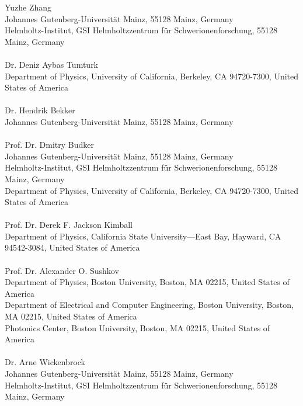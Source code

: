 \documentclass{WileyMSP-template}
\begin{document}
	
	\begin{affiliations}
		Yuzhe Zhang\\
		Johannes Gutenberg-Universit{\"a}t Mainz, 55128 Mainz, Germany\\
		Helmholtz-Institut, GSI Helmholtzzentrum f{\"u}r Schwerionenforschung, 55128 Mainz, Germany\\
		\,\\
		Dr. Deniz Aybas Tumturk\\
		Department of Physics, University of California, Berkeley, CA 94720-7300, United States of America\\
		\,\\
		Dr. Hendrik Bekker\\
		Johannes Gutenberg-Universit{\"a}t Mainz, 55128 Mainz, Germany\\
		\,\\
		Prof. Dr. Dmitry Budker\\
		Johannes Gutenberg-Universit{\"a}t Mainz, 55128 Mainz, Germany\\
		Helmholtz-Institut, GSI Helmholtzzentrum f{\"u}r Schwerionenforschung, 55128 Mainz, Germany\\
		Department of Physics, University of California, Berkeley, CA 94720-7300, United States of America\\
		\,\\
		Prof. Dr. Derek F. Jackson Kimball\\
		Department of Physics, California State University—East Bay, Hayward, CA 94542-3084, United States of America\\
		\,\\
		Prof. Dr. Alexander O. Sushkov\\
		Department of Physics, Boston University, Boston, MA 02215, United States of America\\
		Department of Electrical and Computer Engineering, Boston University, Boston, MA 02215, United States of America\\
		Photonics Center, Boston University, Boston, MA 02215, United States of America\\
		\,\\
		Dr. Arne Wickenbrock\\
		Johannes Gutenberg-Universit{\"a}t Mainz, 55128 Mainz, Germany\\
		Helmholtz-Institut, GSI Helmholtzzentrum f{\"u}r Schwerionenforschung, 55128 Mainz, Germany\\

	\end{affiliations}
\end{document}

